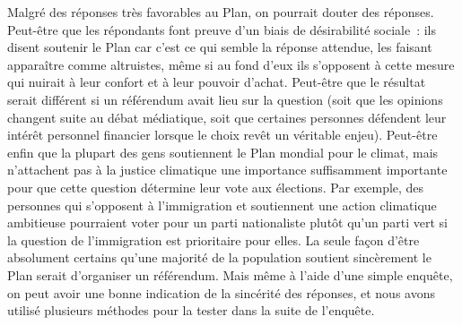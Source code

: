 \documentclass[a5paper,french]{memoir}
\begin{document}
Malgré des réponses très favorables au Plan, on pourrait douter des réponses. Peut-être que les répondants font preuve d'un biais de désirabilité sociale~: ils disent soutenir le Plan car c'est ce qui semble la réponse attendue, les faisant apparaître comme altruistes, même si au fond d'eux ils s'opposent à cette mesure qui nuirait à leur confort et à leur pouvoir d'achat. Peut-être que le résultat serait différent si un référendum avait lieu sur la question (soit que les opinions changent suite au débat médiatique, soit que certaines personnes défendent leur intérêt personnel financier lorsque le choix revêt un véritable enjeu). Peut-être enfin que la plupart des gens soutiennent le Plan mondial pour le climat, mais n'attachent pas à la justice climatique une importance suffisamment importante pour que cette question détermine leur vote aux élections. Par exemple, des personnes qui s'opposent à l'immigration et soutiennent une action climatique ambitieuse pourraient voter pour un parti nationaliste plutôt qu'un parti vert si la question de l'immigration est prioritaire pour elles. La seule façon d'être absolument certains qu'une majorité de la population soutient sincèrement le Plan serait d'organiser un référendum. Mais même à l'aide d'une simple enquête, on peut avoir une bonne indication de la sincérité des réponses, et nous avons utilisé plusieurs méthodes pour la tester dans la suite de l'enquête.
\end{document}
